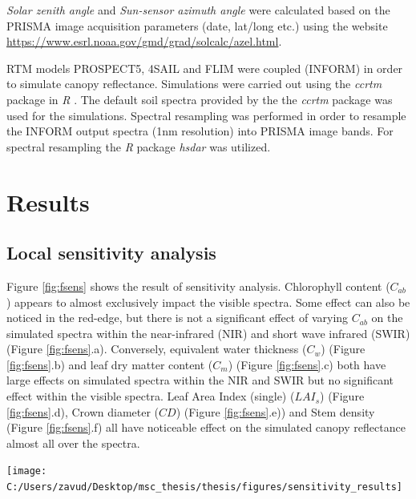 \documentclass[a4paper, nobind]{templates/ociamthesis}
\let\origfigure\figure
\let\endorigfigure\endfigure
\renewenvironment{figure}[1][2] {
    \expandafter\origfigure\expandafter[H]
} {
    \endorigfigure
}
\begin{document}
\emph{Solar zenith angle} and \emph{Sun-sensor azimuth angle} were calculated based on the PRISMA image acquisition parameters (date, lat/long etc.) using the website \url{https://www.esrl.noaa.gov/gmd/grad/solcalc/azel.html}.

RTM models PROSPECT5, 4SAIL and FLIM were coupled (INFORM) in order to simulate canopy reflectance. Simulations were carried out using the \emph{ccrtm} package \citep{ccrtm} in \emph{R} \citep{r}. The default soil spectra provided by the the \emph{ccrtm} package \citep{ccrtm} was used for the simulations. Spectral resampling was performed in order to resample the INFORM output spectra (1nm resolution) into PRISMA image bands. For spectral resampling the \emph{R} package \emph{hsdar} \citep{hsdar} was utilized.

\hypertarget{results}{%
\chapter{Results}\label{results}}

\hypertarget{local-sensitivity-analysis-1}{%
\section{Local sensitivity analysis}\label{local-sensitivity-analysis-1}}

Figure \ref{fig:fsens} shows the result of sensitivity analysis. Chlorophyll content (\(C_{ab}\)) appears to almost exclusively impact the visible spectra. Some effect can also be noticed in the red-edge, but there is not a significant effect of varying \(C_{ab}\) on the simulated spectra within the near-infrared (NIR) and short wave infrared (SWIR) (Figure \ref{fig:fsens}.a). Conversely, equivalent water thickness (\(C_{w}\)) (Figure \ref{fig:fsens}.b) and leaf dry matter content (\(C_{m}\)) (Figure \ref{fig:fsens}.c) both have large effects on simulated spectra within the NIR and SWIR but no significant effect within the visible spectra. Leaf Area Index (single) (\(LAI_{s}\)) (Figure \ref{fig:fsens}.d), Crown diameter (\(CD\)) (Figure \ref{fig:fsens}.e)) and Stem density (Figure \ref{fig:fsens}.f) all have noticeable effect on the simulated canopy reflectance almost all over the spectra.

\newpage

\begin{figure}

{\centering \texttt{[image: C:/Users/zavud/Desktop/msc\_thesis/thesis/figures/sensitivity\_results]} 

}

\caption{Effects of varying the chosen parameters on the simulated spectra}\label{fig:fsens}
\end{figure}
\end{document}
